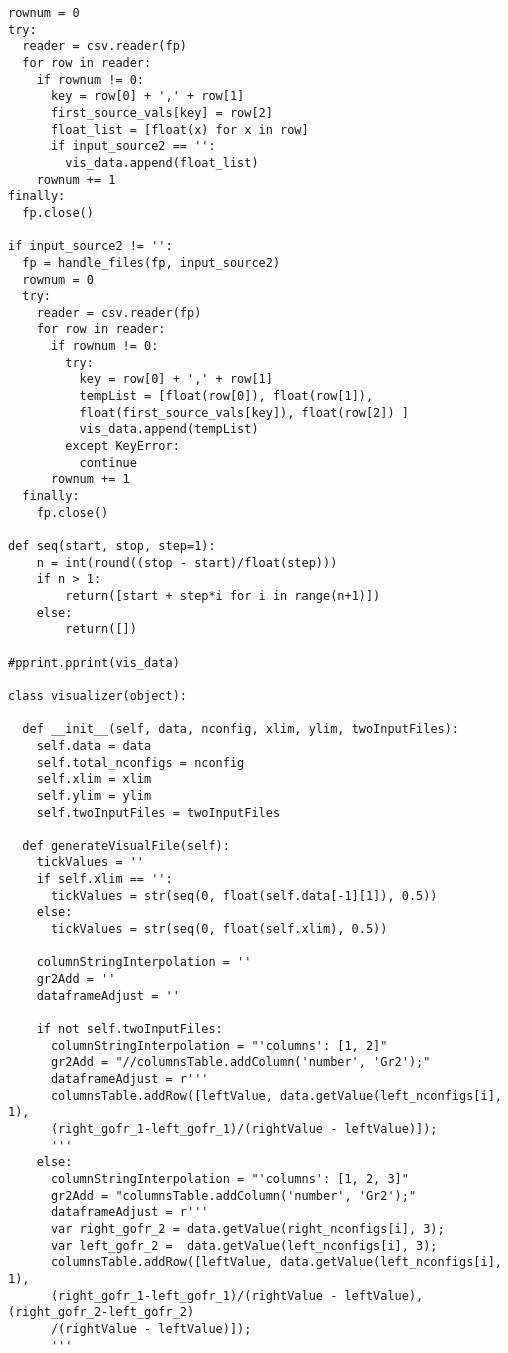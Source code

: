 \begin{verbatim}
rownum = 0
try:
  reader = csv.reader(fp) 
  for row in reader:
    if rownum != 0:
      key = row[0] + ',' + row[1]
      first_source_vals[key] = row[2]
      float_list = [float(x) for x in row]
      if input_source2 == '':
        vis_data.append(float_list)
    rownum += 1
finally:
  fp.close()
  
if input_source2 != '':
  fp = handle_files(fp, input_source2)
  rownum = 0
  try:
    reader = csv.reader(fp) 
    for row in reader:
      if rownum != 0:
        try:
          key = row[0] + ',' + row[1]
          tempList = [float(row[0]), float(row[1]), 
          float(first_source_vals[key]), float(row[2]) ]
          vis_data.append(tempList)
        except KeyError:
          continue
      rownum += 1
  finally:
    fp.close()

def seq(start, stop, step=1):
    n = int(round((stop - start)/float(step)))
    if n > 1:
        return([start + step*i for i in range(n+1)])
    else:
        return([])
  
#pprint.pprint(vis_data)

class visualizer(object):

  def __init__(self, data, nconfig, xlim, ylim, twoInputFiles):
    self.data = data
    self.total_nconfigs = nconfig
    self.xlim = xlim
    self.ylim = ylim
    self.twoInputFiles = twoInputFiles
    
  def generateVisualFile(self):
    tickValues = ''
    if self.xlim == '':
      tickValues = str(seq(0, float(self.data[-1][1]), 0.5))
    else:
      tickValues = str(seq(0, float(self.xlim), 0.5))

    columnStringInterpolation = ''
    gr2Add = ''
    dataframeAdjust = ''

    if not self.twoInputFiles:
      columnStringInterpolation = "'columns': [1, 2]"
      gr2Add = "//columnsTable.addColumn('number', 'Gr2');"
      dataframeAdjust = r'''
      columnsTable.addRow([leftValue, data.getValue(left_nconfigs[i], 1),
      (right_gofr_1-left_gofr_1)/(rightValue - leftValue)]);
      '''
    else:
      columnStringInterpolation = "'columns': [1, 2, 3]"
      gr2Add = "columnsTable.addColumn('number', 'Gr2');"
      dataframeAdjust = r'''
      var right_gofr_2 = data.getValue(right_nconfigs[i], 3);
      var left_gofr_2 =  data.getValue(left_nconfigs[i], 3); 
      columnsTable.addRow([leftValue, data.getValue(left_nconfigs[i], 1),
      (right_gofr_1-left_gofr_1)/(rightValue - leftValue),(right_gofr_2-left_gofr_2)
      /(rightValue - leftValue)]);
      '''


\end{verbatim}
